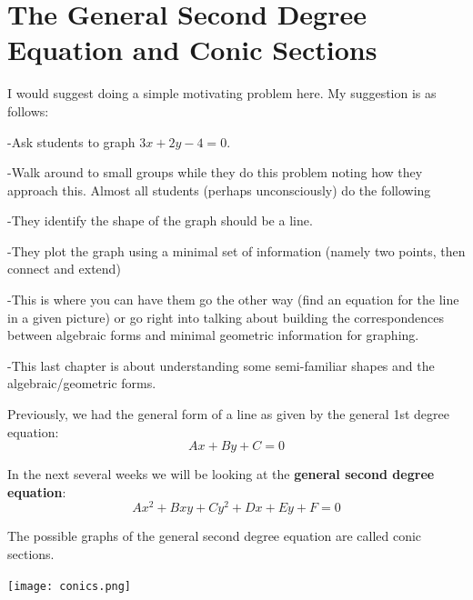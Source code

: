 \chapter{The General Second Degree Equation and Conic Sections}
\begin{annotation}
I would suggest doing a simple motivating problem here. My suggestion is as follows:

-Ask students to graph $3x+2y-4=0$.

-Walk around to small groups while they do this problem noting how they approach this. Almost all students (perhaps unconsciously) do the following

-They identify the shape of the graph should be a line.

-They plot the graph using a minimal set of information (namely two points, then connect and extend)

-This is where you can have them go the other way (find an equation for the line in a given picture) or go right into talking about building the correspondences between algebraic forms and minimal geometric information for graphing.

-This last chapter is about understanding some semi-familiar shapes and the algebraic/geometric forms.

\end{annotation}

\begin{info} Previously, we had the general form of a line as given by the general 1st degree equation: $$Ax+By+C=0$$

In the next several weeks we will be looking at the \textbf{general second degree equation}: $$Ax^2+Bxy+Cy^2+Dx+Ey+F=0$$

The possible graphs of the general second degree equation are called conic sections.
\begin{center}\texttt{[image: conics.png]}\end{center}
\end{info}
